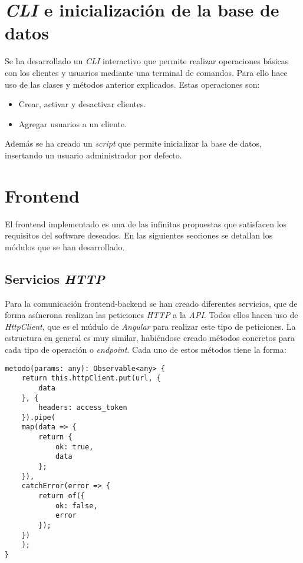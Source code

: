 \section{\textit{CLI} e inicialización de la base de datos}


Se ha desarrollado un \textit{CLI} interactivo que permite realizar operaciones básicas con los clientes y usuarios mediante una terminal de comandos. Para ello hace uso de las clases y métodos anterior explicados. Estas operaciones son:
\begin{itemize}
	\item Crear, activar y desactivar clientes.
	\item Agregar usuarios a un cliente.
\end{itemize}


Además se ha creado un \textit{script} que permite inicializar la base de datos, insertando un usuario administrador por defecto.





\section{Frontend}

El frontend implementado es una de las infinitas propuestas que satisfacen los requisitos del software deseados. En las siguientes secciones se detallan los módulos que se han desarrollado.



\subsection{Servicios \textit{HTTP}}


Para la comunicación frontend-backend se han creado diferentes servicios, que de forma asíncrona realizan las peticiones \textit{HTTP} a la \textit{API}. Todos ellos hacen uso de \textit{HttpClient}, que es el múdulo de \textit{Angular} para realizar este tipo de peticiones. La estructura en general es muy similar, habiéndose creado métodos concretos para cada tipo de operación o \textit{endpoint}. Cada uno de estos métodos tiene la forma:

\begin{lstlisting}
metodo(params: any): Observable<any> {
	return this.httpClient.put(url, {
		data
	}, {
		headers: access_token
	}).pipe(
	map(data => {
		return {
			ok: true,
			data
		};
	}),
	catchError(error => {
		return of({
			ok: false,
			error
		});
	})
	);
}
\end{lstlisting}

